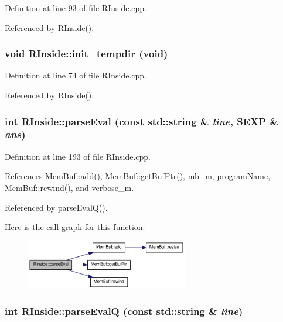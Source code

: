 Definition at line 93 of file RInside.cpp.

Referenced by RInside().\hypertarget{classRInside_ae045f7e3d8b0881e2af8cdfb5c5fc118}{
\subsubsection[{init\_\-tempdir}]{\setlength{\rightskip}{0pt plus 5cm}void RInside::init\_\-tempdir (void)}}
\label{classRInside_ae045f7e3d8b0881e2af8cdfb5c5fc118}


Definition at line 74 of file RInside.cpp.

Referenced by RInside().\hypertarget{classRInside_a4cf10e78fb73bfda699f921c28e6b985}{
\subsubsection[{parseEval}]{\setlength{\rightskip}{0pt plus 5cm}int RInside::parseEval (const std::string \& {\em line}, \/  SEXP \& {\em ans})}}
\label{classRInside_a4cf10e78fb73bfda699f921c28e6b985}


Definition at line 193 of file RInside.cpp.

References MemBuf::add(), MemBuf::getBufPtr(), mb\_\-m, programName, MemBuf::rewind(), and verbose\_\-m.

Referenced by parseEvalQ().

Here is the call graph for this function:\nopagebreak
\begin{figure}[H]
\begin{center}
\leavevmode
\includegraphics[width=200pt]{classRInside_a4cf10e78fb73bfda699f921c28e6b985_cgraph}
\end{center}
\end{figure}
\hypertarget{classRInside_a9f18dc5011e1e32a52360b3d88f9bab7}{
\subsubsection[{parseEvalQ}]{\setlength{\rightskip}{0pt plus 5cm}int RInside::parseEvalQ (const std::string \& {\em line})}}
\label{classRInside_a9f18dc5011e1e32a52360b3d88f9bab7}


